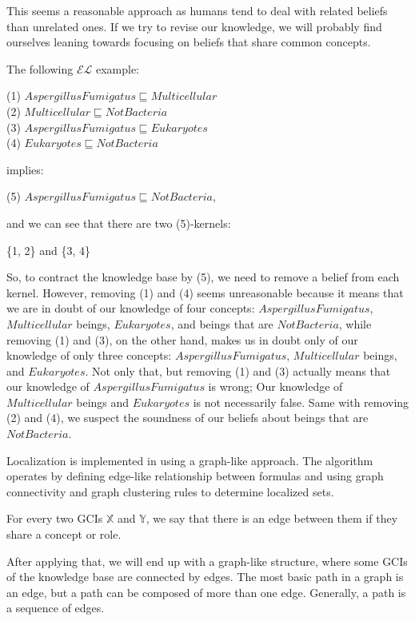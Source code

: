 This seems a reasonable approach as humans tend to deal with related beliefs than unrelated ones. If we try to revise our knowledge, we will probably find ourselves leaning towards focusing on beliefs that share common concepts. 

The following $\mathcal{EL}$ example:
\begin{center}
(1) $AspergillusFumigatus \sqsubseteq Multicellular $ \\
(2) $Multicellular \sqsubseteq NotBacteria$ \\
(3) $AspergillusFumigatus \sqsubseteq Eukaryotes$ \\
(4) $Eukaryotes \sqsubseteq NotBacteria$ 
\end{center}
implies:
\begin{center}
(5) $AspergillusFumigatus \sqsubseteq NotBacteria$,
\end{center}
and we can see that there are two (5)-kernels:
\begin{center}
\{1, 2\} and \{3, 4\}
\end{center}

So, to contract the knowledge base by (5), we need to remove a belief from each kernel. However, removing (1) and (4) seems unreasonable because it means that we are in doubt of our knowledge of four concepts: $AspergillusFumigatus$, $Multicellular$ beings, $Eukaryotes$, and beings that are $NotBacteria$, while removing (1) and (3), on the other hand, makes us in doubt only of our knowledge of only three concepts: $AspergillusFumigatus$, $Multicellular$ beings, and $Eukaryotes$. Not only that, but removing (1) and (3) actually means that our knowledge of $AspergillusFumigatus$ is wrong; Our knowledge of $Multicellular$ beings and $Eukaryotes$ is not necessarily false. Same with removing (2) and (4), we suspect the soundness of our beliefs about beings that are $NotBacteria$.

Localization is implemented in \cite{zwei} using a graph-like approach. The algorithm operates by defining edge-like relationship between formulas and using graph connectivity and graph clustering rules to determine localized sets. 

\begin{defn}
For every two GCIs $\mathbb{X}$ and $\mathbb{Y}$, we say that there is an edge between them if they share a concept or role.
\end{defn}

After applying that, we will end up with a graph-like structure, where some GCIs of the knowledge base are connected by edges. The most basic path in a graph is an edge, but a path can be composed of more than one edge. Generally, a path is a sequence of edges.

